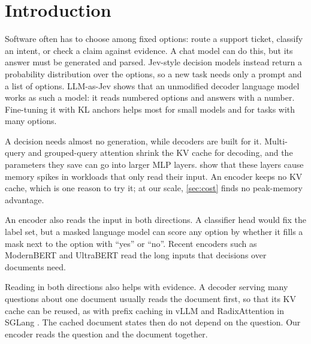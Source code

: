 \section{Introduction}
\label{sec:intro}

Software often has to choose among fixed options: route a support ticket, classify an intent, or check a claim against evidence.
A chat model can do this, but its answer must be generated and parsed.
Jev-style decision models \citep{jev} instead return a probability distribution over the options, so a new task needs only a prompt and a list of options.
LLM-as-Jev \citep{li2026llmasjev} shows that an unmodified decoder language model works as such a model: it reads numbered options and answers with a number.
Fine-tuning it with KL anchors helps most for small models and for tasks with many options.

A decision needs almost no generation, while decoders are built for it.
Multi-query and grouped-query attention \citep{mqa, gqa} shrink the KV cache for decoding, and the parameters they save can go into larger MLP layers.
\citet{prefillonly} show that these layers cause memory spikes in workloads that only read their input.
An encoder keeps no KV cache, which is one reason to try it; at our scale, \cref{sec:cost} finds no peak-memory advantage.

An encoder also reads the input in both directions.
A classifier head would fix the label set, but a masked language model can score any option by whether it fills a mask next to the option with ``yes'' or ``no''.
Recent encoders such as ModernBERT \citep{modernbert} and UltraBERT \citep{ultrabert} read the long inputs that decisions over documents need.

Reading in both directions also helps with evidence.
A decoder serving many questions about one document usually reads the document first, so that its KV cache can be reused, as with prefix caching in vLLM \citep{vllm} and RadixAttention in SGLang \citep{sglang}.
The cached document states then do not depend on the question.
Our encoder reads the question and the document together.

